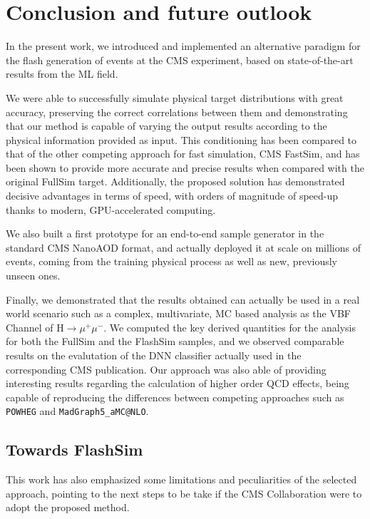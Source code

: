 \chapter{Conclusion and future outlook}\label{ch:outlook} %
In the present work, we introduced and implemented an alternative paradigm for the flash generation of events at the CMS experiment, based on state-of-the-art results from the ML field.

We were able to successfully simulate physical target distributions with great accuracy, preserving the correct correlations between them and demonstrating that our method is capable of varying the output results according to the physical information provided as input. This conditioning has been compared to that of the other competing approach for fast simulation, CMS FastSim, and has been shown to provide more accurate and precise results when compared with the original FullSim target. Additionally, the proposed solution has demonstrated decisive advantages in terms of speed, with orders of magnitude of speed-up thanks to modern, GPU-accelerated computing.

We also built a first prototype for an end-to-end sample generator in the standard CMS NanoAOD format, and actually deployed it at scale on millions of events, coming from the training physical process as well as new, previously unseen ones. 

Finally, we demonstrated that the results obtained can actually be used in a real world scenario such as a complex, multivariate, MC based analysis as the VBF Channel of H$\rightarrow\mu^+\mu^-$. We computed the key derived quantities for the analysis for both the FullSim and the FlashSim samples, and we observed comparable results on the evalutation of the DNN classifier actually used in the corresponding CMS publication.
Our approach was also able of providing interesting results regarding the calculation of higher order QCD effects, being capable of reproducing the differences between competing approaches such as \texttt{POWHEG} and \texttt{MadGraph5\_aMC@NLO}.

\section{Towards FlashSim}
This work has also emphasized some limitations and peculiarities of the selected approach, pointing to the next steps to be take if the CMS Collaboration were to adopt the proposed method.

